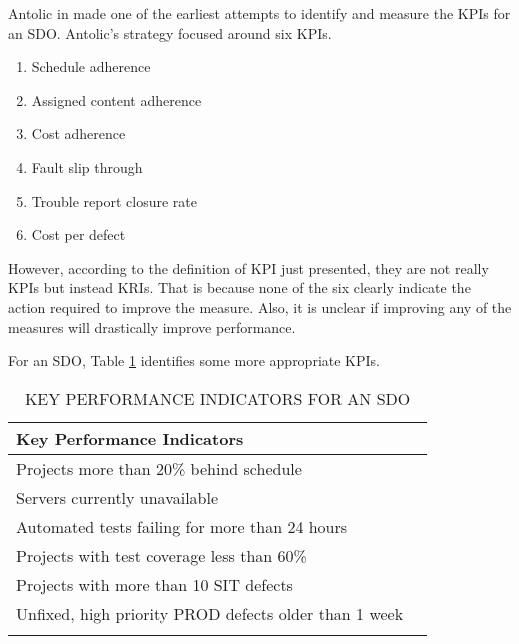 \documentclass[SDSUThesis.tex]{subfiles}
\begin{document}
            Antolic in \cite{Antolic2008} made one of the earliest attempts
            to identify and measure the KPIs for an SDO. Antolic's strategy
            focused around six KPIs.
            \begin{enumerate}
                \item Schedule adherence
                \item Assigned content adherence
                \item Cost adherence
                \item Fault slip through
                \item Trouble report closure rate
                \item Cost per defect
            \end{enumerate}
            However, according to the definition of KPI just presented,
            they are not really KPIs but instead KRIs.  That is because
            none of the six clearly indicate the action required to 
            improve the measure.  Also, it is unclear if improving any of
            the measures will drastically improve performance.
            
            For an SDO, Table \ref{tab:KPI} identifies some more appropriate
            KPIs.  
            
            \begin{longtable}{@{}l l}
                \toprule%
                 \centering%
                 {\bfseries Key Performance Indicators} &
                 \\
                
                \cmidrule[0.4pt](r{0.125em}){1-1}%
                \endhead
                
                Projects more than 20\% behind schedule \\
                \myrowcolour%
                Servers currently unavailable \\
                Automated tests failing for more than 24 hours \\
                \myrowcolour%
                Projects with test coverage less than 60\% \\
                Projects with more than 10 SIT defects \\
                \myrowcolour%
                Unfixed, high priority PROD defects older than 1 week  \\
                
                \bottomrule
                
                \caption{KEY PERFORMANCE INDICATORS FOR AN SDO}
                \label{tab:KPI}
            \end{longtable}
    
\end{document}

